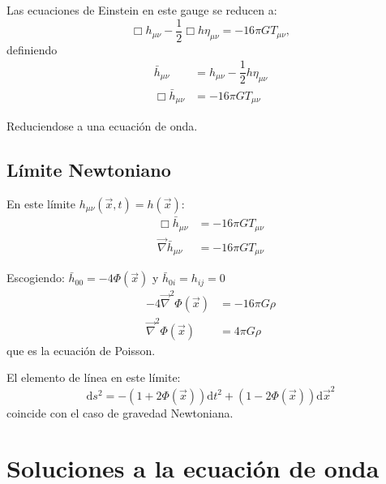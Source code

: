 \documentclass[../main]{subfiles}
\begin{document}
\begin{adjustwidth}{0pt}{-100pt}
Las ecuaciones de Einstein en este gauge se reducen a:
\begin{equation}
    \Box h_{\mu\nu}-\dfrac{1}{2}\Box h \eta_{\mu\nu}=-16\pi G T_{\mu\nu},
\end{equation}
definiendo 
\begin{equation}
    \begin{split}
        \bar{h}_{\mu\nu}&=h_{\mu\nu}-\dfrac{1}{2}h \eta_{\mu\nu} \\
        \Box \bar{h}_{\mu\nu}&=-16\pi G T_{\mu\nu}
    \end{split}
\end{equation}

Reduciendose a una ecuación de onda.

\subsection{Límite Newtoniano}

En este límite $h_{\mu\nu}(\vec{x}, t)=h(\vec{x})$:
\begin{equation}
    \begin{split}
        \Box \bar{h}_{\mu\nu}&=-16\pi G T_{\mu\nu} \\
        \vec{\nabla} \bar{h}_{\mu\nu}&=-16\pi G T_{\mu\nu}
    \end{split}
\end{equation}

Escogiendo: $\bar{h}_{00}=-4\Phi(\vec{x})$ y $\bar{h}_{0i}=h_{ij}=0$
\begin{equation}
    \begin{split}
        -4\vec{\nabla}^2 \Phi (\vec{x})&=-16\pi G\rho \\
        \vec{\nabla}^2 \Phi(\vec{x})&=4\pi G\rho
    \end{split}
\end{equation}
que es la ecuación de Poisson.

El elemento de línea en este límite:
\begin{equation}
    \mathrm{d}s^2=-(1+2\Phi(\vec{x}))\mathrm{d}t^2+(1-2\Phi(\vec{x}))\mathrm{d}\vec{x}^2
\end{equation}
coincide con el caso de gravedad Newtoniana.

\section{Soluciones a la ecuación de onda}\label{part8.2}


\end{adjustwidth}
\end{document}
